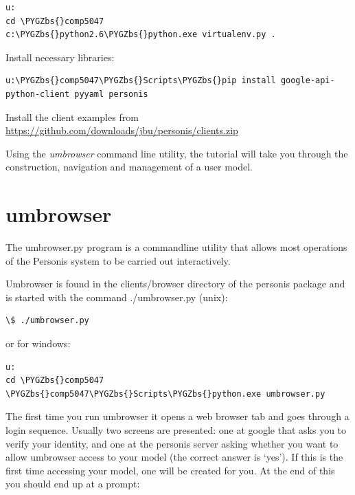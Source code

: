 \documentclass[letterpaper,10pt,english]{sphinxmanual}
\def\PYGZbs{\char`\\}
\begin{document}
\begin{Verbatim}[commandchars=\\\{\}]
u:
cd \PYGZbs{}comp5047
c:\PYGZbs{}python2.6\PYGZbs{}python.exe virtualenv.py .
\end{Verbatim}

Install necessary libraries:

\begin{Verbatim}[commandchars=\\\{\}]
u:\PYGZbs{}comp5047\PYGZbs{}Scripts\PYGZbs{}pip install google-api-python-client pyyaml personis
\end{Verbatim}

Install the client examples from \href{https://github.com/downloads/jbu/personis/clients.zip}{https://github.com/downloads/jbu/personis/clients.zip}

Using the \emph{umbrowser} command line utility, the tutorial will take you through the construction, navigation and
management of a user model.


\section{umbrowser}
\label{Tutorial:umbrowser}
The umbrowser.py program is a commandline utility that allows most
operations of the Personis system to be carried out interactively.

Umbrowser is found in the clients/browser directory of the personis package and is started with
the command ./umbrowser.py (unix):

\begin{Verbatim}[commandchars=\\\{\}]
\$ ./umbrowser.py
\end{Verbatim}

or for windows:

\begin{Verbatim}[commandchars=\\\{\}]
u:
cd \PYGZbs{}comp5047
\PYGZbs{}comp5047\PYGZbs{}Scripts\PYGZbs{}python.exe umbrowser.py
\end{Verbatim}

The first time you run umbrowser it opens a web browser tab and goes through a login sequence. Usually two screens are presented: one at google that asks you to verify your identity, and one at the personis server asking whether you want to allow umbrowser access to your model (the correct answer is `yes'). If this is the first time accessing your model, one will be created for you. At the end of this you should end up at a prompt:
\end{document}

